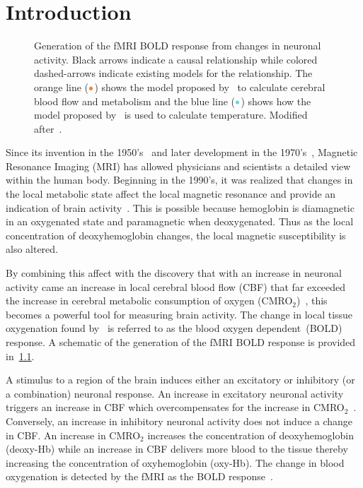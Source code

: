 \chapter{Introduction}
\label{ch:introduction}

\begin{figure}[tb]
  \centering
  \vspace{10pt}
  
  \caption[Generation of the fMRI BOLD response and a corresponding temperature change]{\label{fig:flowchart} Generation of the fMRI BOLD response from changes in neuronal activity.  Black arrows indicate a causal relationship while colored dashed-arrows indicate existing models for the relationship.  The orange line ($\color{goldfish}\bullet$) shows the model proposed by~\citet{sotero2011} to calculate cerebral blood flow and metabolism and the blue line ($\color{aoi}\bullet$) shows how the model proposed by~\citet{collins} is used to calculate temperature.  Modified after~\citet{sotero2007}.}
\end{figure}

Since its invention in the 1950's~\citep{carr1954} and later development in the 1970's~\citep{lauterbur1973}, {M}agnetic {R}esonance {I}maging ({MRI}) has allowed physicians and scientists a detailed view within the human body.  Beginning in the 1990's, it was realized that changes in the local metabolic state affect the local magnetic resonance and provide an indication of brain activity~\citep{ogawa1990,kwong1992}.  This is possible because hemoglobin is diamagnetic in an oxygenated state and paramagnetic when deoxygenated.  Thus as the local concentration of deoxyhemoglobin changes, the local magnetic susceptibility is also altered.  

By combining this affect with the discovery that with an increase in neuronal activity came an increase in local cerebral blood flow (CBF) that far exceeded the increase in cerebral metabolic consumption of oxygen (CMRO$_2$)~\citet{fox1986}, this becomes a powerful tool for measuring brain activity.  The change in local tissue oxygenation found by~\citet{fox1986} is referred to as the blood oxygen dependent~(BOLD) response.  A schematic of the generation of the fMRI BOLD response is provided in~\cref{fig:flowchart}.

A stimulus to a region of the brain induces either an excitatory or inhibitory (or a combination) neuronal response.  An increase in excitatory neuronal activity triggers an increase in CBF which overcompensates for the increase in CMRO$_2$~\citep{fox1986}.  Conversely, an increase in inhibitory neuronal activity does not induce a change in CBF.  An increase in CMRO$_2$ increases the concentration of deoxyhemoglobin (deoxy-Hb) while an increase in CBF delivers more blood to the tissue thereby increasing the concentration of oxyhemoglobin (oxy-Hb).  The change in blood oxygenation is detected by the fMRI as the BOLD response~\citep{kwong1992}.

